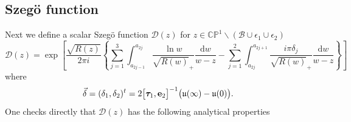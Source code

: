 \documentclass[10pt,oneside,reqno]{amsart}
\numberwithin{equation}{section}
\renewcommand{\d}{{\mathrm d}}
\begin{document}
\subsection{Szeg\"o function}
\label{Szegofun}

 Next we define a scalar Szeg\"o function $\mathcal{D}(z)$ for $z\in\mathbb{C}\mathbb P^1\backslash (\mathcal B\cup \epsilon_1\cup \epsilon_2)$
\begin{equation}\label{Szdef}
  \mathcal{D}(z) = \exp\left[\frac{\sqrt{R(z)}}{2\pi i}\left\{\sum_{j=1}^3\int_{a_{2j-1}}^{a_{2j}}
  \frac{\ln w}{\sqrt{R(w)}_+}\frac{\d w}{w-z}-\sum_{j=1}^2\int_{a_{2j}}^{a_{2j+1}}\frac{i\pi\delta_j}{\sqrt{R(w)}_+}
  \frac{\d w}{w-z}\right\}\right]
\end{equation}
where
\begin{equation}\label{dchoice}
  \vec{\delta}=(\delta_1,\delta_2)^t = 2\big[{\boldsymbol \tau}_1,{\bf e}_2\big]^{-1}\big(\mathfrak{u}(\infty)-\mathfrak{u}(0)\big).
\end{equation}
 One checks directly that $\mathcal{D}(z)$ has the following analytical properties
\end{document}
